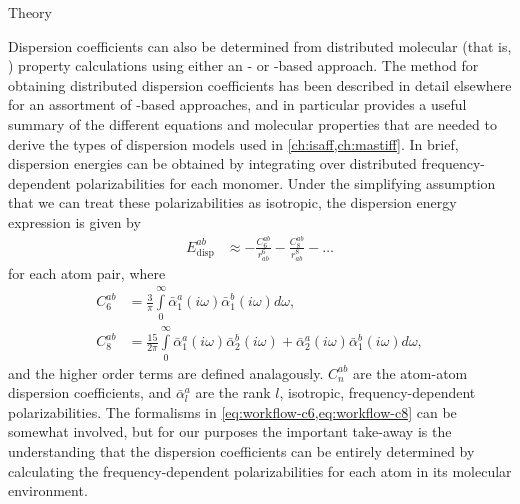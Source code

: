 \begin{subsubsection}{Theory}

Dispersion coefficients can also be determined from distributed molecular
(that is, \aim)
property calculations using either an \isa- or \dma-based approach. The method
for obtaining distributed dispersion coefficients has been described in detail elsewhere for an assortment of \dma-based
approaches,
\cite{Williams2003,Misquitta2008,McDaniel2012,McDaniel2013,stone2013theory,McDaniel2014a}
and  in particular provides a useful summary of the
different equations and molecular properties that are needed to derive
the types of dispersion models used in \cref{ch:isaff,ch:mastiff}.
In brief, \aim dispersion energies can be obtained by integrating over
distributed 
frequency-dependent polarizabilities for each monomer.
Under the simplifying assumption that we can treat these polarizabilities as
isotropic,
the dispersion energy expression is given by
\begin{align}
\label{eq:workflow-edisp}
E^{ab}_{\text{disp}} &\approx - \frac{C^{ab}_6}{r_{ab}^6} - \frac{C^{ab}_8}{r_{ab}^8} - \ldots
\end{align}
for each atom pair, where 
\begin{align}
\label{eq:workflow-c6}
C^{ab}_6 &= \frac{3}{\pi} \int\limits_{0}^{\infty} \bar{\alpha}^a_{1}
(i\omega) \bar{\alpha}^b_{1} (i\omega) d\omega , \\
%
C^{ab}_8 &= \frac{15}{2\pi} \int\limits_{0}^{\infty} 
\bar{\alpha}^a_{1} (i\omega) \bar{\alpha}^b_{2} (i\omega) 
+ \bar{\alpha}^a_{2} (i\omega) \bar{\alpha}^b_{1} (i\omega) 
d\omega , 
\label{eq:workflow-c8}
\end{align}
and the higher order terms are defined analagously. $C^{ab}_n$ are the
atom-atom dispersion coefficients, and $\bar{\alpha}^a_l$ are the
rank $l$, isotropic, \aim frequency-dependent polarizabilities. 
The formalisms in \cref{eq:workflow-c6,eq:workflow-c8} can be somewhat
involved,
but for our purposes the important take-away is the understanding that the dispersion
coefficients can be entirely determined by calculating the frequency-dependent
polarizabilities for each atom in its molecular environment.


\end{subsubsection}
